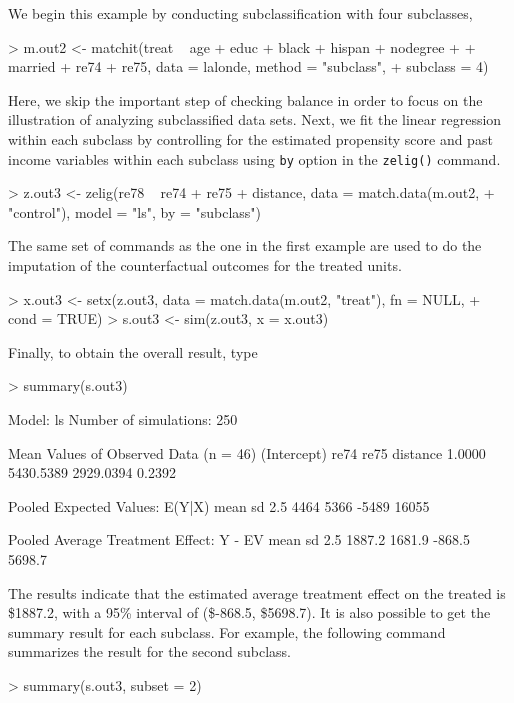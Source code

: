 \begin{enumerate}
  We begin this example by conducting subclassification with four subclasses,
\begin{Schunk}
\begin{Sinput}
> m.out2 <- matchit(treat ~ age + educ + black + hispan + nodegree + 
+     married + re74 + re75, data = lalonde, method = "subclass", 
+     subclass = 4)
\end{Sinput}
\end{Schunk}
Here, we skip the important step of checking balance in order to focus
on the illustration of analyzing subclassified data sets.  Next, we
fit the linear regression within each subclass by controlling for the
estimated propensity score and past income variables within each
subclass using {\tt by} option in the {\tt zelig()} command. 
\begin{Schunk}
\begin{Sinput}
> z.out3 <- zelig(re78 ~ re74 + re75 + distance, data = match.data(m.out2, 
+     "control"), model = "ls", by = "subclass")
\end{Sinput}
\end{Schunk}
The same set of commands as the one in the first example are used to
do the imputation of the counterfactual outcomes for the treated
units.
\begin{Schunk}
\begin{Sinput}
> x.out3 <- setx(z.out3, data = match.data(m.out2, "treat"), fn = NULL, 
+     cond = TRUE)
> s.out3 <- sim(z.out3, x = x.out3)
\end{Sinput}
\end{Schunk}
Finally, to obtain the overall result, type
\begin{Schunk}
\begin{Sinput}
> summary(s.out3)
\end{Sinput}
\begin{Soutput}

  Model: ls 
  Number of simulations: 250 

Mean Values of Observed Data (n = 46) 
(Intercept)        re74        re75    distance 
     1.0000   5430.5389   2929.0394      0.2392 

Pooled Expected Values: E(Y|X)
 mean    sd  2.5% 97.5% 
 4464  5366 -5489 16055 

Pooled Average Treatment Effect: Y - EV
  mean     sd   2.5%  97.5% 
1887.2 1681.9 -868.5 5698.7 

\end{Soutput}
\end{Schunk}
The results indicate that the estimated average treatment effect on
the treated is
\$1887.2,
with a 95\% interval of
(\$-868.5,
\$5698.7).
It is also possible to get the summary result for each subclass. For
example, the following command summarizes the result for the second
subclass.
\begin{Schunk}
\begin{Sinput}
> summary(s.out3, subset = 2)
\end{Sinput}
\begin{Soutput}


\end{Soutput}
\end{Schunk}
\end{enumerate}
